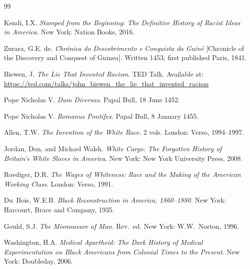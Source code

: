 \documentclass[12pt,openany]{book}
\begin{document}
\begin{thebibliography}{99}


Kendi, I.X. \textit{Stamped from the Beginning: The Definitive History of Racist Ideas in America}. New York: Nation Books, 2016.

Zurara, G.E. de. \textit{Chr\'{o}nica do Descobrimento e Conquista da Guin\'{e}} [Chronicle of the Discovery and Conquest of Guinea]. Written 1453; first published Paris, 1841.

Biewen, J. \textit{The Lie That Invented Racism}. TED Talk. Available at: \url{https://ted.com/talks/john_biewen_the_lie_that_invented_racism}


Pope Nicholas V. \textit{Dum Diversas}. Papal Bull, 18 June 1452.

Pope Nicholas V. \textit{Romanus Pontifex}. Papal Bull, 8 January 1455.


Allen, T.W. \textit{The Invention of the White Race}. 2 vols. London: Verso, 1994--1997.

Jordan, Don, and Michael Walsh. \textit{White Cargo: The Forgotten History of Britain's White Slaves in America}. New York: New York University Press, 2008.

Roediger, D.R. \textit{The Wages of Whiteness: Race and the Making of the American Working Class}. London: Verso, 1991.

Du~Bois, W.E.B. \textit{Black Reconstruction in America, 1860--1880}. New York: Harcourt, Brace and Company, 1935.


Gould, S.J. \textit{The Mismeasure of Man}. Rev.\ ed. New York: W.W.\ Norton, 1996.

Washington, H.A. \textit{Medical Apartheid: The Dark History of Medical Experimentation on Black Americans from Colonial Times to the Present}. New York: Doubleday, 2006.



\end{thebibliography}
\end{document}
